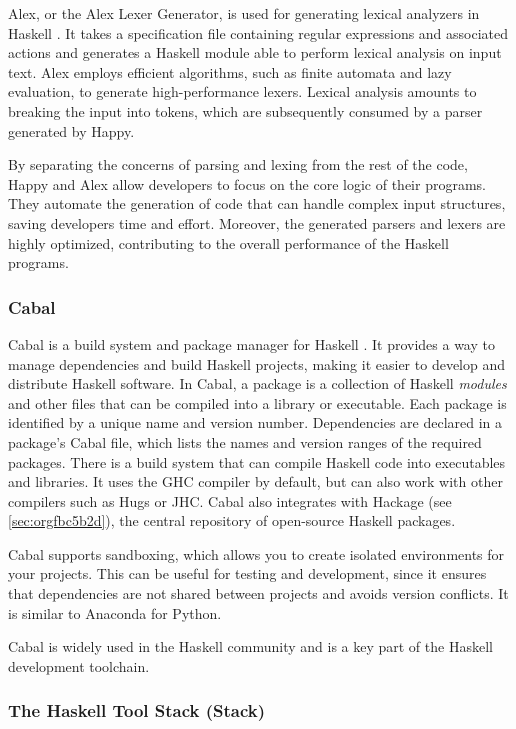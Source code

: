 \documentclass[a4paper, titlepage, twoside]{article}
\begin{document}
Alex, or the Alex Lexer Generator, is used for generating lexical analyzers in Haskell \autocite{AlexLexicalAnalyser2023}. It takes a specification file containing regular expressions and associated actions and generates a Haskell module able to perform lexical analysis on input text. Alex employs efficient algorithms, such as finite automata and lazy evaluation, to generate high-performance lexers. Lexical analysis amounts to breaking the input into tokens, which are subsequently consumed by a parser generated by Happy.

By separating the concerns of parsing and lexing from the rest of the code, Happy and Alex allow developers to focus on the core logic of their programs. They automate the generation of code that can handle complex input structures, saving developers time and effort. Moreover, the generated parsers and lexers are highly optimized, contributing to the overall performance of the Haskell programs.

\subsubsection{Cabal}
\label{sec:org8f6c0b4}

Cabal is a build system and package manager for Haskell \autocite{Cabal2023}. It provides a way to manage dependencies and build Haskell projects, making it easier to develop and distribute Haskell software. In Cabal, a package is a collection of Haskell \emph{modules} and other files that can be compiled into a library or executable. Each package is identified by a unique name and version number. Dependencies are declared in a package's Cabal file, which lists the names and version ranges of the required packages. There is a build system that can compile Haskell code into executables and libraries. It uses the GHC compiler by default, but can also work with other compilers such as Hugs or JHC. Cabal also integrates with Hackage (see \ref{sec:orgfbc5b2d}), the central repository of open-source Haskell packages.

Cabal supports sandboxing, which allows you to create isolated environments for your projects. This can be useful for testing and development, since it ensures that dependencies are not shared between projects and avoids version conflicts. It is similar to Anaconda for Python.

Cabal is widely used in the Haskell community and is a key part of the Haskell development toolchain.

\subsubsection{The Haskell Tool Stack (Stack)}
\label{sec:orgf74c7b4}
\end{document}
